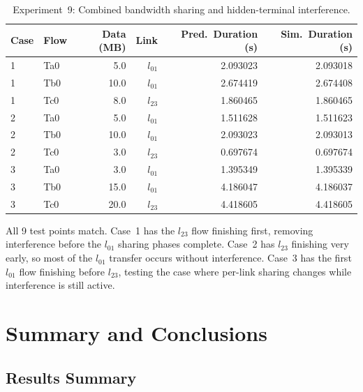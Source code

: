 \documentclass[11pt,a4paper]{article}
\begin{document}
\begin{table}[h]
\centering
\caption{Experiment~9: Combined bandwidth sharing and hidden-terminal interference.}
\label{tab:exp9}
\begin{tabular}{llrrrr}
\toprule
Case & Flow & Data (MB) & Link & Pred.\ Duration (s) & Sim.\ Duration (s) \\
\midrule
1 & Ta0 &  5.0 & $l_{01}$ & 2.093023 & 2.093018 \\
1 & Tb0 & 10.0 & $l_{01}$ & 2.674419 & 2.674408 \\
1 & Tc0 &  8.0 & $l_{23}$ & 1.860465 & 1.860465 \\
\midrule
2 & Ta0 &  5.0 & $l_{01}$ & 1.511628 & 1.511623 \\
2 & Tb0 & 10.0 & $l_{01}$ & 2.093023 & 2.093013 \\
2 & Tc0 &  3.0 & $l_{23}$ & 0.697674 & 0.697674 \\
\midrule
3 & Ta0 &  3.0 & $l_{01}$ & 1.395349 & 1.395339 \\
3 & Tb0 & 15.0 & $l_{01}$ & 4.186047 & 4.186037 \\
3 & Tc0 & 20.0 & $l_{23}$ & 4.418605 & 4.418605 \\
\bottomrule
\end{tabular}
\end{table}

All 9 test points match. Case~1 has the $l_{23}$ flow finishing first, removing interference before the $l_{01}$ sharing phases complete. Case~2 has $l_{23}$ finishing very early, so most of the $l_{01}$ transfer occurs without interference. Case~3 has the first $l_{01}$ flow finishing before $l_{23}$, testing the case where per-link sharing changes while interference is still active.

\section{Summary and Conclusions}
\label{sec:conclusions}

\subsection{Results Summary}
\end{document}
